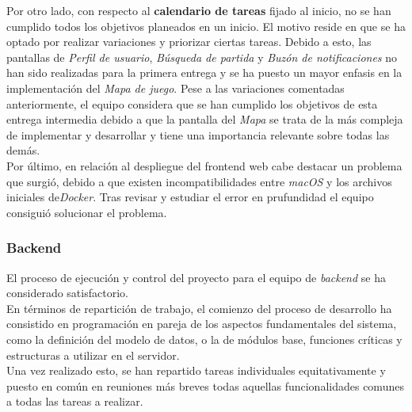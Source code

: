 \documentclass[11pt, a4paper, titlepage]{article}
\begin{document}
Por otro lado, con respecto al \textbf{calendario de tareas} fijado al inicio, no se han cumplido todos los objetivos planeados en un inicio. El motivo reside en que se ha optado por realizar variaciones y priorizar ciertas tareas.
Debido a esto, las pantallas de \textit{Perfil de usuario}, \textit{Búsqueda de partida} y \textit{Buzón de notificaciones} no han sido realizadas para la primera entrega y se ha puesto un mayor enfasis en la implementación del \textit{Mapa de juego}. 
Pese a las variaciones comentadas anteriormente, el equipo considera que se han cumplido los objetivos de esta entrega intermedia debido a que la pantalla del \textit{Mapa} se trata de la más compleja de implementar y desarrollar y tiene una importancia relevante sobre todas las demás. \\

Por último, en relación al despliegue del frontend web cabe destacar un problema que surgió, debido a que existen incompatibilidades entre \textit{macOS} y los archivos iniciales de\textit{Docker}. Tras revisar y estudiar el error en prufundidad el equipo consiguió solucionar el problema. 

\subsubsection{Backend}

El proceso de ejecución y control del proyecto para el equipo de \textit{backend} se ha considerado satisfactorio.\\


En términos de repartición de trabajo, el comienzo del proceso de desarrollo ha consistido en programación en pareja de los aspectos fundamentales del sistema, como la definición del modelo de datos, o la de módulos base, funciones críticas y estructuras a utilizar en el servidor. \\

Una vez realizado esto, se han repartido tareas individuales equitativamente y puesto en común en reuniones más breves todas aquellas funcionalidades comunes a todas las tareas a realizar. \\

\end{document}
